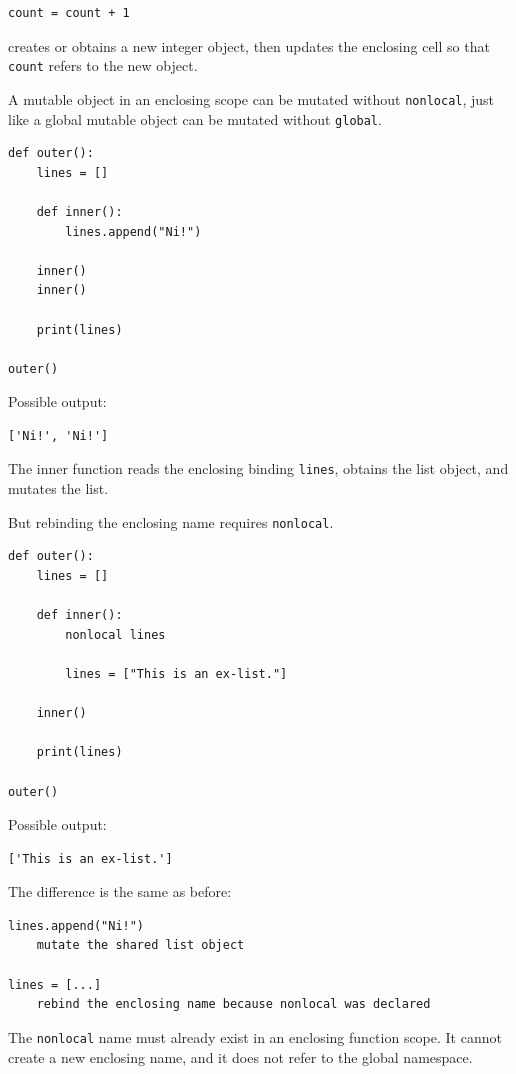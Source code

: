 \begin{verbatim}
count = count + 1
\end{verbatim}

creates or obtains a new integer object, then updates the enclosing cell so that \texttt{count} refers to the new object.

A mutable object in an enclosing scope can be mutated without \texttt{nonlocal}, just like a global mutable object can be mutated without \texttt{global}.

\begin{verbatim}
def outer():
    lines = []

    def inner():
        lines.append("Ni!")

    inner()
    inner()

    print(lines)

outer()
\end{verbatim}

Possible output:

\begin{verbatim}
['Ni!', 'Ni!']
\end{verbatim}

The inner function reads the enclosing binding \texttt{lines}, obtains the list object, and mutates the list.

But rebinding the enclosing name requires \texttt{nonlocal}.

\begin{verbatim}
def outer():
    lines = []

    def inner():
        nonlocal lines

        lines = ["This is an ex-list."]

    inner()

    print(lines)

outer()
\end{verbatim}

Possible output:

\begin{verbatim}
['This is an ex-list.']
\end{verbatim}

The difference is the same as before:

\begin{verbatim}
lines.append("Ni!")
    mutate the shared list object

lines = [...]
    rebind the enclosing name because nonlocal was declared
\end{verbatim}

The \texttt{nonlocal} name must already exist in an enclosing function scope. It cannot create a new enclosing name, and it does not refer to the global namespace.

